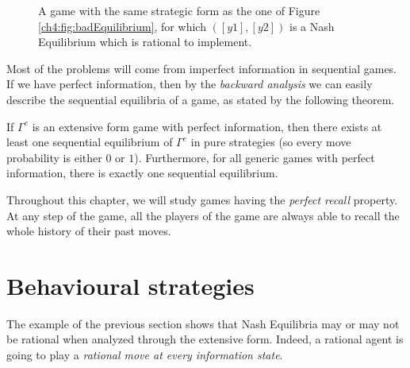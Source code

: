 \begin{example}
\begin{figure}[!ht]
\begin{center}
\end{center}
\caption{A game with the same strategic form as the one of Figure \ref{ch4:fig:badEquilibrium}, for which $([y1],[y2])$ is a Nash Equilibrium which is rational to implement.}
\label{ch4:fig:badEquilibrium2}
\end{figure}

\end{example}

Most of the problems will come from imperfect information in sequential games. If we have perfect information, then by the \emph{backward analysis} we can easily describe the sequential equilibria of a game, as stated by the following theorem.

\begin{theorem}
If $ \Gamma^e $ is an extensive form game with perfect information, then there exists at least one sequential equilibrium of $ \Gamma^e $ in pure strategies (so every move probability is either $0$ or $1$). Furthermore, for all generic games with perfect information, there is exactly one sequential equilibrium.
\end{theorem}

Throughout this chapter, we will study games having the \emph{perfect recall} property. At any step of the game, all the players of the game are always able to recall the whole history of their past moves.

\section{Behavioural strategies}
\label{ch4:sec:extform}
The example of the previous section shows that Nash Equilibria may or may not be rational when analyzed through the extensive form. Indeed, a rational agent is going to play a \emph{rational move at every information state}.\\

